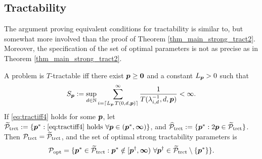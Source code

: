 \documentclass[11pt,a4paper]{article}
\begin{document}
\subsection{Tractability} \label{sec:tractability}


The argument proving equivalent conditions for tractability is similar to, but somewhat more involved than the proof of Theorem \ref{thm_main_strong_tract2}.  Moreover, the specification of the set of optimal parameters is not as precise as in Theorem \ref{thm_main_strong_tract2}.

\begin{theorem}\label{thm_main_tract2}
A problem is $T$-tractable iff there exist $\boldsymbol{p}\ge \boldsymbol{0}$ and a constant $L_{\boldsymbol{p}} > 0$ such that
\begin{equation} \label{eq:tractiff4}
     S_{\boldsymbol{p}}:=\sup_{d \in \mathbb{N}}
     \sum_{i = \lceil L_{\boldsymbol{p}}\, T(0,d,\boldsymbol{p}) \rceil}^\infty \frac{1}{T(\lambda^{-1}_{i,d},d,\boldsymbol{p})}< \infty.
\end{equation}
If \eqref{eq:tractiff4} holds for some $\boldsymbol{p}$, let  $\widetilde{\mathcal{P}}_{\textup{trct}} : = \{\boldsymbol{p}^* : \eqref{eq:tractiff4} \text{ holds }\forall \boldsymbol{p} \in (\boldsymbol{p}^*,\boldsymbol{\infty})\}$, and   $\widehat{\mathcal{P}}_{\textup{trct}} : = \{\boldsymbol{p}^* : 2\boldsymbol{p} \in \widetilde{\mathcal{P}}_{\textup{trct}}\}$.  Then $\mathcal{P}_{\textup{trct}} = \widetilde{\mathcal{P}}_{\textup{trct}}$, and the set of optimal strong tractability parameters is
\[
\mathcal{P}_{\textup{opt}} =
\{\boldsymbol{p}^* \in \widetilde{\mathcal{P}}_{\textup{trct}} :  \boldsymbol{p}^* \notin [\boldsymbol{p}^\dagger,\boldsymbol{\infty}) \ \forall \boldsymbol{p}^\dagger \in  \widetilde{\mathcal{P}}_{\textup{trct}} \setminus \{\boldsymbol{p}^*\} \}.
\]\end{theorem}
\end{document}
